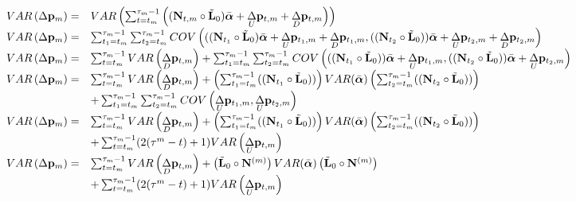 \documentclass[12pt]{article}
\begin{document}
\begin{bibunit}
\begin{tiny}
\begin{equation}
\begin{array}{rl}
VAR\left(\Delta {\bf p}_m\right) =& VAR\left(\sum_{t=t_m}^{\tau_m-1}\left(({\bf N}_{t,m}\circ\tilde{\bf L}_0)\bar{\boldsymbol{\alpha}}+\underset{U}\Delta {\bf p}_{t, m}+\underset{D}\Delta {\bf p}_{t, m}\right)\right)\\

VAR\left(\Delta {\bf p}_m\right) =& \sum_{t_1=t_m}^{\tau_m-1}\sum_{t_2=t_m}^{\tau_m-1}COV\left((({\bf N}_{t_1}\circ\tilde{\bf L}_0)\bar{\boldsymbol{\alpha}}+\underset{U}\Delta {\bf p}_{t_1, m}+\underset{D}\Delta {\bf p}_{t_1, m}, (({\bf N}_{t_2}\circ\tilde{\bf L}_0))\bar{\boldsymbol{\alpha}}+\underset{U}\Delta {\bf p}_{t_2, m}+\underset{D}\Delta {\bf p}_{t_2, m}\right)\\

VAR\left(\Delta {\bf p}_m\right) =& \sum_{t=t_m}^{\tau_m-1}VAR\left(\underset{D}\Delta {\bf p}_{t,m}\right)+\sum_{t_1=t_m}^{\tau_m-1}\sum_{t_2=t_m}^{\tau_m-1}COV\left((({\bf N}_{t_1}\circ\tilde{\bf L}_0))\bar{\boldsymbol{\alpha}}+\underset{U}\Delta {\bf p}_{t_1, m},  (({\bf N}_{t_2}\circ\tilde{\bf L}_0))\bar{\boldsymbol{\alpha}}+\underset{U}\Delta {\bf p}_{t_2, m}\right)\\


VAR\left(\Delta {\bf p}_m\right) =& \sum_{t=t_m}^{\tau_m-1}VAR\left(\underset{D}\Delta {\bf p}_{t,m}\right)+\left(\sum_{t_1=t_m}^{\tau_m-1} (({\bf N}_{t_1}\circ\tilde{\bf L}_0))\right)VAR(\bar{\boldsymbol{\alpha}})\left(\sum_{t_2=t_m}^{\tau_m-1} (({\bf N}_{t_2}\circ\tilde{\bf L}_0))\right)\\
&+\sum_{t_1=t_m}^{\tau_m-1}\sum_{t_2=t_m}^{\tau_m-1}COV\left(\underset{U}\Delta {\bf p}_{t_1, m},\underset{U}\Delta {\bf p}_{t_2, m}\right)\\

VAR\left(\Delta {\bf p}_m\right) =& \sum_{t=t_m}^{\tau_m-1}VAR\left(\underset{D}\Delta {\bf p}_{t, m}\right)+\left(\sum_{t_1=t_m}^{\tau_m-1} (({\bf N}_{t_1}\circ\tilde{\bf L}_0))\right)VAR(\bar{\boldsymbol{\alpha}})\left(\sum_{t_2=t_m}^{\tau_m-1} (({\bf N}_{t_2}\circ\tilde{\bf L}_0))\right)\\
&+\sum_{t=t_m}^{\tau_m-1}(2(\tau^m-t)+1)VAR\left(\underset{U}\Delta {\bf p}_{t,m}\right)\\

VAR\left(\Delta {\bf p}_m\right) =& \sum_{t=t_m}^{\tau_m-1}VAR\left(\underset{D}\Delta {\bf p}_{t, m}\right)+\left(\tilde{\bf L}_0\circ{\bf N}^{(m)}\right)VAR(\bar{\boldsymbol{\alpha}})\left(\tilde{\bf L}_0\circ{\bf N}^{(m)}\right)\\
&+\sum_{t=t_m}^{\tau_m-1}(2(\tau^m-t)+1)VAR\left(\underset{U}\Delta {\bf p}_{t,m}\right)\\



\end{array}
\end{equation}
\end{tiny}
\end{bibunit}
\end{document}
